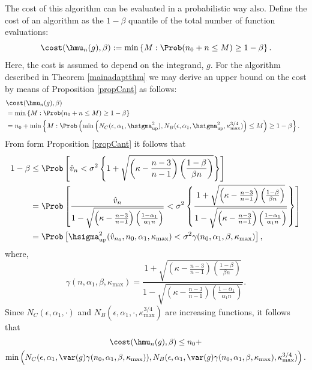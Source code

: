 \documentclass[12pt]{amsart}
\newcommand{\hv}{\hat{v}}
\begin{document}
The cost of this algorithm can be evaluated in a probabilistic way also.  Define the cost of an algorithm as the $1-\beta$ quantile of the total number of function evaluations:
\begin{equation}
\cost(\hmu_n(g),\beta) := \min\left\{M : \Prob(n_0 + n \le M) \ge 1-\beta  \right \}.
\end{equation}
Here, the cost is assumed to depend on the integrand, $g$.  For the algorithm described in Theorem \ref{mainadaptthm} we may derive an upper bound on the cost by means of Proposition \ref{propCant} as follows:
\begin{align*}
\lefteqn{\cost(\hmu_n(g),\beta)} \\
&= \min\left\{M : \Prob(n_0 + n \le M) \ge 1-\beta  \right \}\\
& = n_0 + \min\left\{M : \Prob\left( \min\left( N_C(\epsilon,\alpha_1,\hsigma^2_{\text{\rm up}}), N_B(\epsilon,\alpha_1,\hsigma^2_{\text{\rm up}},\kappa_{\max}^{3/4}) \right) \le M\right) \ge 1-\beta  \right \}.
\end{align*}
From form Proposition \ref{propCant} it follows that 
\begin{align*}
1-\beta & \le \Prob\left[\hv_n < \sigma^2 \left\{1 + \sqrt{\left ( \kappa  - \frac{n-3}{n-1}\right)\left(\frac{1-\beta}{\beta n}\right)}\right\} \right] \\
& = \Prob\left[\frac{\hv_n} {1 - \sqrt{\left ( \kappa  - \frac{n-3}{n-1}\right)\left(\frac{1-\alpha_1}{\alpha_1 n}\right)}} < \sigma^2 \left\{\frac{1 + \sqrt{\left ( \kappa  - \frac{n-3}{n-1}\right)\left(\frac{1-\beta}{\beta n}\right)}} {1 - \sqrt{\left ( \kappa  - \frac{n-3}{n-1}\right)\left(\frac{1-\alpha_1}{\alpha_1 n}\right)}} \right\} \right] \\
& = \Prob\left[\hsigma^2_{\text{\rm up}}(\hv_{n_0},n_0,\alpha_1,\kappa_{\max}) < \sigma^2 \gamma(n_0,\alpha_1,\beta,\kappa_{\max}) \right],
\end{align*}
where,
\[
\gamma(n,\alpha_1,\beta,\kappa_{\max}) = \frac{1 + \sqrt{\left ( \kappa  - \frac{n-3}{n-1}\right)\left(\frac{1-\beta}{\beta n}\right)}} {1 - \sqrt{\left ( \kappa  - \frac{n-3}{n-1}\right)\left(\frac{1-\alpha_1}{\alpha_1 n}\right)}}.
\]
Since $N_C(\epsilon,\alpha_1, \cdot)$ and $N_B(\epsilon,\alpha_1, \cdot,\kappa_{\max}^{3/4})$ are increasing functions, it follows that
\begin{multline} \label{adaptcost}
\cost(\hmu_n(g),\beta) \le n_0 + \\
\min\left( N_C(\epsilon,\alpha_1,\var(g)\gamma(n_0,\alpha_1,\beta,\kappa_{\max})), N_B(\epsilon,\alpha_1,\var(g)\gamma(n_0,\alpha_1,\beta,\kappa_{\max}),\kappa_{\max}^{3/4}) \right).
\end{multline}
\end{document}
